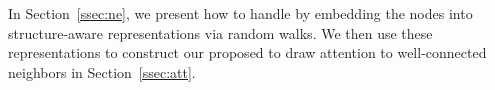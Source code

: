 




In Section~\ref{ssec:ne}, we present how to handle \ndiff by embedding the nodes into structure-aware representations via random walks. We then use these representations to construct our proposed \emphasis to draw attention to well-connected neighbors in Section~\ref{ssec:att}.


